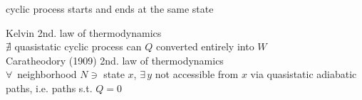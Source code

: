 cyclic process starts and ends at the same state

Kelvin 2nd. law of thermodynamics \\
\phantom{\quad \, } $\nexists $ quasistatic cyclic process can $Q$ converted entirely into $W$  \\

Caratheodory (1909) 2nd. law of thermodynamics \\
\phantom{\quad \, } $\forall \, $ neighborhood $N \ni $ state $x$, $\exists \, y$ not accessible from $x$ via quasistatic adiabatic paths, i.e. paths s.t. $Q=0$



